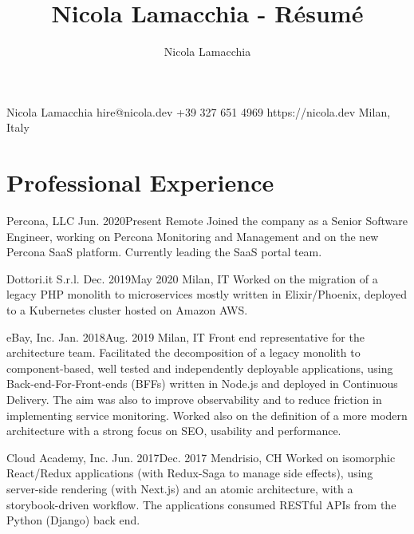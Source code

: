 \documentclass{resume}
\begin{document}
\title{Nicola Lamacchia - Résumé}
\author{Nicola Lamacchia}

\heading%
    {Nicola}
    {Lamacchia}
    {}
    {hire@nicola.dev}%
    {+39 327 651 4969}%
    {https://nicola.dev}
    {Milan, Italy}

\separator[cvlightgray]


\section{Professional Experience}

%
    {Percona, LLC}%
    {Jun. 2020}{Present}%
    {Remote}%
    {Joined the company as a Senior Software Engineer, working on Percona
        Monitoring and Management and on the new Percona SaaS platform.
        Currently leading the SaaS portal team.}

%
    {Dottori.it S.r.l.}%
    {Dec. 2019}{May 2020}%
    {Milan, IT}%
    {Worked on the migration of a legacy PHP monolith to microservices mostly
        written in Elixir/Phoenix, deployed to a Kubernetes cluster hosted on
        Amazon AWS.}

%
    {eBay, Inc.}%
    {Jan. 2018}{Aug. 2019}%
    {Milan, IT}%
    {Front end representative for the architecture team. Facilitated the
        decomposition of a legacy monolith to component-based, well tested and
        independently deployable applications, using Back-end-For-Front-ends
        (BFFs) written in Node.js and deployed in Continuous Delivery. The aim
        was also to improve observability and to reduce friction in
        implementing service monitoring. Worked also on the definition of a
        more modern architecture with a strong focus on SEO, usability and
        performance.}

%
    {Cloud Academy, Inc.}%
    {Jun. 2017}{Dec. 2017}%
    {Mendrisio, CH}%
    {Worked on isomorphic React/Redux applications (with Redux-Saga to manage
        side effects), using server-side rendering (with Next.js) and an atomic
        architecture, with a storybook-driven workflow. The applications
        consumed RESTful APIs from the Python (Django) back end.}
\end{document}
